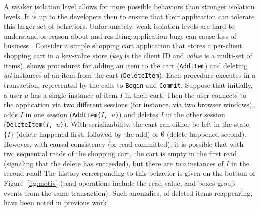 A weaker isolation level allows for more possible behaviors than stronger
isolation levels. It is up to the developers then to ensure that their
application can tolerate this larger set of behaviors. Unfortunately, weak
isolation levels are hard to understand or reason about
\cite{DBLP:conf/popl/BrutschyD0V17,adya-thesis} and resulting application bugs
can cause loss of business \cite{DBLP:conf/sigmod/WarszawskiB17}.
Consider a simple shopping cart application that stores a per-client shopping
cart in a key-value store (\textit{key} is the client ID and \textit{value} is a
multi-set of items).  shows procedures for adding an item to the cart
(\texttt{AddItem}) and deleting \textit{all} instances of an item from the cart
(\texttt{DeleteItem}). Each procedure executes in a transaction, represented by
the calls to \texttt{Begin} and \texttt{Commit}. Suppose that initially, a user $u$ has 
a single instance of item $I$ in their cart.
Then the user connects to the application via two different
sessions (for instance, via two browser windows), adds $I$ in one session
(\texttt{AddItem($I$, $u$)}) and deletes $I$ in the other session
(\texttt{DeleteItem($I$, $u$)}). With serializability, the cart can either be
left in the state $\{ I \}$ (delete happened first, followed by the add) or $\emptyset$ (delete
happened second). However, with causal consistency (or read committed), it is possible that with two
sequential reads of the shopping cart, the cart is empty in the first read
(signaling that the delete has succeeded), but there are \textit{two} instances of $I$ 
in the second read! The history corresponding to this behavior 
is given on the bottom of Figure~\ref{fig:motiv} 
(read operations include the read value, and boxes group events from the same transaction).
Such anomalies, of deleted items reappearing, have been
noted in previous work \cite{DBLP:conf/sosp/DeCandiaHJKLPSVV07}. 



